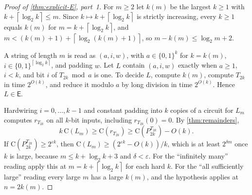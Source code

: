 \documentclass[11pt]{article}
\theoremstyle{definition}
\theoremstyle{remark}
\newcommand{\bits}{\{0,1\}}
\newcommand{\CC}{\mathrm{C}}
\newcommand{\ceil}[1]{\left\lceil #1\right\rceil}
\numberwithin{equation}{section}
\begin{document}
\begin{proof}[Proof of \cref{thm:explicit-E}, part~1]
For $m\geq2$ let $k(m)$ be the largest $k\geq1$ with
$k+\ceil{\log_2k}\leq m$.  Since $k\mapsto k+\ceil{\log_2k}$ is strictly
increasing, every $k\geq1$ equals $k(m)$ for $m=k+\ceil{\log_2k}$, and
$m<(k(m)+1)+\ceil{\log_2(k(m)+1)}$, so $m-k(m)\leq\log_2m+2$.

A string of length $m$ is read as $(a,i,w)$, with $a\in\bits^{k}$ for
$k=k(m)$, $i\in\bits^{\ceil{\log_2 k}}$, and padding $w$.  Let $L$
contain $(a,i,w)$ exactly when $a\geq1$, $i<k$, and bit $i$ of
$T_{2k}\bmod a$ is one.  To decide $L$, compute $k(m)$, compute $T_{2k}$
in time $2^{O(k)}$, and reduce it modulo $a$ by long division in time
$2^{O(k)}$.  Hence $L\in\mathsf{E}$.

Hardwiring $i=0,\ldots,k-1$ and constant padding into $k$ copies of a
circuit for $L_m$ computes $r_{T_{2k}}$ on all $k$-bit inputs, including
$r_{T_{2k}}(0)=0$.  By \cref{thm:remainders},
\[
  k\,\CC(L_m)\geq\CC(r_{T_{2k}})\geq\CC(P_{2k}^{T_{2k}})-O(k).
\]
If $\CC(P_{2k}^{T_{2k}})\geq2^{\varepsilon k}$, then
$\CC(L_m)\geq(2^{\varepsilon k}-O(k))/k$, which is at least $2^{\delta m}$
once $k$ is large, because $m\leq k+\log_2k+3$ and $\delta<\varepsilon$.
For the ``infinitely many'' reading apply this at
$m=k+\ceil{\log_2k}$ for each hard $k$.  For the ``all sufficiently
large'' reading every large $m$ has a large $k(m)$, and the hypothesis
applies at $n=2k(m)$.
\end{proof}
\end{document}
